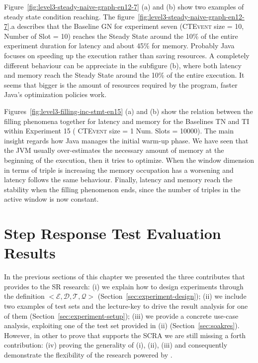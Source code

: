 Figure~\ref{fig:level3-steady-naive-graph-en12-7} (a) and (b) show two examples of steady state condition reaching. The figure~\ref{fig:level3-steady-naive-graph-en12-7}.a describes that the Baseline GN for experiment seven (\textsc{CTEvent} size = 10, Number of Slot = 10) reaches the Steady State around the 10\% of the entire experiment duration for latency and about 45\% for memory. 
Probably Java focuses on speeding up the execution rather than saving resources. A completely different behaviour can be appreciate in the subfigure (b), where both latency and memory reach the Steady State around the 10\% of the entire execution. It seems that bigger is the amount of resources required by the program, faster Java's optimization policies work.

Figures~\ref{fig:level3-filling-inc-stmt-en15} (a) and (b) show the relation between the filling phenomena together for latency and memory for the Baselines TN and TI within Experiment 15 ( \textsc{CTEvent} size = 1 Num. Slots = 10000). The main insight regards how Java manages the initial warm-up phase. We have seen that the JVM usually over-estimates the necessary amount of memory at the beginning of the execution, then it tries to optimize. When the window dimension in terms of triple is increasing the memory occupation has a worsening and latency follows the same behaviour. Finally, latency and memory reach the stability when the filling phenomenon ends, since the number of triples in the active window is now constant.















\pagebreak

\section{Step Response Test Evaluation Results}\label{sec:stressres}

In the previous sections of this chapter we presented the three contributes that \name provides to the SR research: (i) we explain how to design experiments through the \name definition $<\mathcal{E},\mathcal{D},\mathcal{T},\mathcal{Q}>$ (Section~\ref{sec:experiment-design}); (ii) we include two examples of test sets and the lecture-key to drive the result analysis for one of them (Section~\ref{sec:experiment-setup}); (iii) we provide a concrete use-case analysis, exploiting one of the test set provided in (ii) (Section~\ref{sec:soakres}). However, in other to prove that \name supports the SCRA we are still missing a forth contribution: (iv) proving the generality of (i), (ii), (iii) and consequently demonstrate the flexibility of the research powered by \namens.

